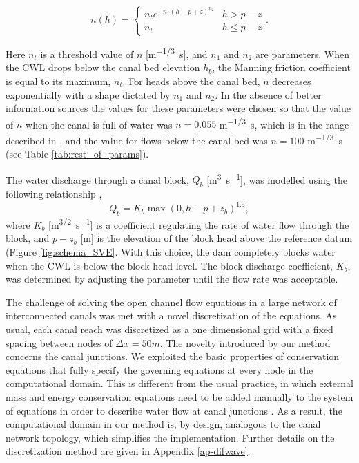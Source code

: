 \documentclass[bg, manuscript]{copernicus}
\begin{document}
\begin{equation} \label{eq:n(h)}
n (h) =
	\begin{cases}
		n_t e^{- n_1 (h - p + z)^{n_2}}& h > p - z \\
		  n_t & h \leq p - z
	\end{cases}.
\end{equation}

Here $n_t$ is a threshold value of $n$ [\unit{m^{-1/3} s}], and $n_1$ and $n_2$ are parameters.
When the CWL drops below the canal bed elevation $h_b$, the Manning friction coefficient is equal to its maximum, $n_t$.
For heads above the canal bed, $n$ decreases exponentially with a shape dictated by $n_1$ and $n_2$.
In the absence of better information sources the values for these parameters were chosen so that the value of $n$ when the canal is full of water was $n = 0.055$ \unit{m^{-1/3} s}, which is in the range described in \citet{szymkiewiczNumericalModelingOpen2010}, and the value for flows below the canal bed was $n = 100$ \unit{m^{-1/3} s} (see Table \ref{tab:rest_of_params}).


The water discharge through a canal block, $Q_b$ [\unit{m^3s^{-1}}],  was modelled using the following relationship \citep{szymkiewiczNumericalModelingOpen2010},
\begin{equation} \label{eq:Qblock}
Q_b = K_b \max\left(0, h - p + z_b\right)^{1.5},
\end{equation}
where $K_b$ [\unit{m^{3/2}s^{-1}}] is a coefficient regulating the rate of water flow through the block, and $p - z_b$ [\unit{m}] is the elevation of the block head above the reference datum (Figure \ref{fig:schema_SVE}.
With this choice, the dam completely blocks water when the CWL is below the block head level.
The block discharge coefficient, $K_b$, was determined by adjusting the parameter until the flow rate was acceptable.

The challenge of solving the open channel flow equations in a large network of interconnected canals was met with a novel discretization of the equations.
As usual, each canal reach was discretized as a one dimensional grid with a fixed spacing between nodes of $\Delta x = 50 \unit{m}$.
The novelty introduced by our method concerns the canal junctions.
We exploited the basic properties of conservation equations that fully specify the governing equations at every node in the computational domain.
This is different from the usual practice, in which external mass and energy conservation equations need to be added manually to the system of equations in order to describe water flow at canal junctions \citep{cungePracticalAspectsComputational1980}.
As a result, the computational domain in our method is, by design, analogous to the canal network topology, which simplifies the implementation.
Further details on the discretization method are given in Appendix \ref{ap-difwave}.
\end{document}
